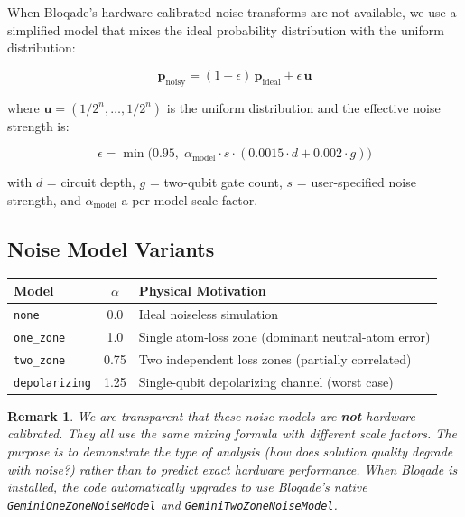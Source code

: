 \documentclass[12pt, a4paper]{article}
\newtheorem{remark}{Remark}[section]
\begin{document}
When Bloqade's hardware-calibrated noise transforms are not available, we use
a simplified model that mixes the ideal probability distribution with the
uniform distribution:

\begin{equation}
\mathbf{p}_{\text{noisy}} = (1 - \epsilon)\, \mathbf{p}_{\text{ideal}}
    + \epsilon\, \mathbf{u}
\label{eq:noise_mixing}
\end{equation}

where $\mathbf{u} = (1/2^n, \ldots, 1/2^n)$ is the uniform distribution and
the effective noise strength is:

\[
\epsilon = \min\bigl(0.95,\; \alpha_{\text{model}} \cdot s
    \cdot (0.0015 \cdot d + 0.002 \cdot g)\bigr)
\]

with $d$ = circuit depth, $g$ = two-qubit gate count, $s$ = user-specified noise
strength, and $\alpha_{\text{model}}$ a per-model scale factor.

\subsection{Noise Model Variants}

\begin{center}
\begin{tabular}{lcp{7cm}}
\toprule
\textbf{Model} & $\alpha$ & \textbf{Physical Motivation} \\
\midrule
\texttt{none} & 0.0 & Ideal noiseless simulation \\
\texttt{one\_zone} & 1.0 & Single atom-loss zone (dominant neutral-atom error) \\
\texttt{two\_zone} & 0.75 & Two independent loss zones (partially correlated) \\
\texttt{depolarizing} & 1.25 & Single-qubit depolarizing channel (worst case) \\
\bottomrule
\end{tabular}
\end{center}

\begin{remark}
We are transparent that these noise models are \textbf{not} hardware-calibrated.
They all use the same mixing formula with different scale factors. The purpose
is to demonstrate the \textit{type} of analysis (how does solution quality
degrade with noise?) rather than to predict exact hardware performance. When
Bloqade is installed, the code automatically upgrades to use Bloqade's native
\texttt{GeminiOneZoneNoiseModel} and \texttt{GeminiTwoZoneNoiseModel}.
\end{remark}
\end{document}
